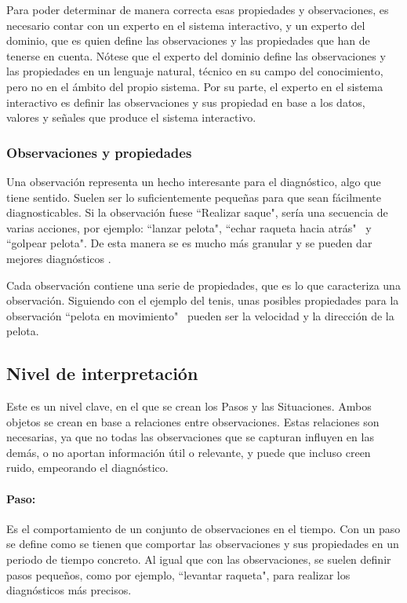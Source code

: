 Para poder determinar de manera correcta esas propiedades y observaciones, es necesario contar con un 
experto en el sistema interactivo, y un experto del dominio, que es quien define las observaciones y las
propiedades que han de tenerse en cuenta. N\'otese que el experto del dominio define las observaciones y las
propiedades en un lenguaje natural, t\'ecnico en su campo del conocimiento, pero no en el \'ambito del propio
sistema. Por su parte, el experto en el sistema interactivo es definir las observaciones y sus propiedad
en base a los datos, valores y se\~nales que produce el sistema interactivo.

\subsubsection{Observaciones y propiedades}
Una observaci\'on representa un hecho interesante para el diagn\'ostico, algo que tiene sentido. Suelen
ser lo suficientemente peque\~nas para que sean f\'acilmente diagnosticables. Si la observaci\'on
fuese ``Realizar saque", ser\'ia una secuencia de varias acciones, por ejemplo: ``lanzar pelota", ``echar raqueta hacia atr\'as" \
y ``golpear pelota". De esta manera se es mucho m\'as granular y se pueden dar mejores diagn\'osticos \cite{INTRASIM:Manual}.

Cada observaci\'on contiene una serie de propiedades, que es lo que caracteriza una observaci\'on. 
Siguiendo con el ejemplo del tenis, unas posibles propiedades para la observaci\'on ``pelota en movimiento" \
pueden ser la velocidad y la direcci\'on de la pelota.

\subsection{Nivel de interpretaci\'on}
Este es un nivel clave, en el que se crean los Pasos y las Situaciones. Ambos objetos se crean en base a relaciones
entre observaciones.
Estas relaciones son necesarias, ya que no todas las observaciones que se capturan influyen en las dem\'as,
o no aportan informaci\'on \'util o relevante, y puede que incluso creen ruido, empeorando el diagn\'ostico.

\paragraph{\textbf{Paso:}}
Es el comportamiento de un conjunto de observaciones en el tiempo. Con un paso se define como se tienen
que comportar las observaciones y sus propiedades en un periodo de tiempo concreto. Al igual que con las observaciones,
se suelen definir pasos peque\~nos, como por ejemplo, ``levantar raqueta", para realizar los diagn\'osticos m\'as precisos.

